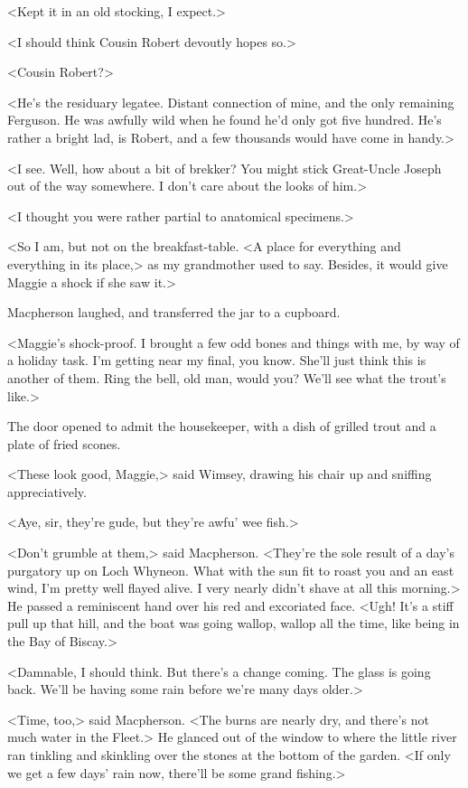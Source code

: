 <Kept it in an old stocking, I expect.>

<I should think Cousin Robert devoutly hopes so.>

<Cousin Robert?>

<He's the residuary legatee. Distant connection of mine, and the only remaining Ferguson. He was awfully wild when he found he'd only got five hundred. He's rather a bright lad, is Robert, and a few thousands would have come in handy.>

<I see. Well, how about a bit of brekker? You might stick Great-Uncle Joseph out of the way somewhere. I don't care about the looks of him.>

<I thought you were rather partial to anatomical specimens.>

<So I am, but not on the breakfast-table. <A place for everything and everything in its place,> as my grandmother used to say. Besides, it would give Maggie a shock if she saw it.>

Macpherson laughed, and transferred the jar to a cupboard.

<Maggie's shock-proof. I brought a few odd bones and things with me, by way of a holiday task. I'm getting near my final, you know. She'll just think this is another of them. Ring the bell, old man, would you? We'll see what the trout's like.>

The door opened to admit the housekeeper, with a dish of grilled trout and a plate of fried scones.

<These look good, Maggie,> said Wimsey, drawing his chair up and sniffing appreciatively.

<Aye, sir, they're gude, but they're awfu' wee fish.>

<Don't grumble at them,> said Macpherson. <They're the sole result of a day's purgatory up on Loch Whyneon. What with the sun fit to roast you and an east wind, I'm pretty well flayed alive. I very nearly didn't shave at all this morning.> He passed a reminiscent hand over his red and excoriated face. <Ugh! It's a stiff pull up that hill, and the boat was going wallop, wallop all the time, like being in the Bay of Biscay.>

<Damnable, I should think. But there's a change coming. The glass is going back. We'll be having some rain before we're many days older.>

<Time, too,> said Macpherson. <The burns are nearly dry, and there's not much water in the Fleet.> He glanced out of the window to where the little river ran tinkling and skinkling over the stones at the bottom of the garden. <If only we get a few days' rain now, there'll be some grand fishing.>

